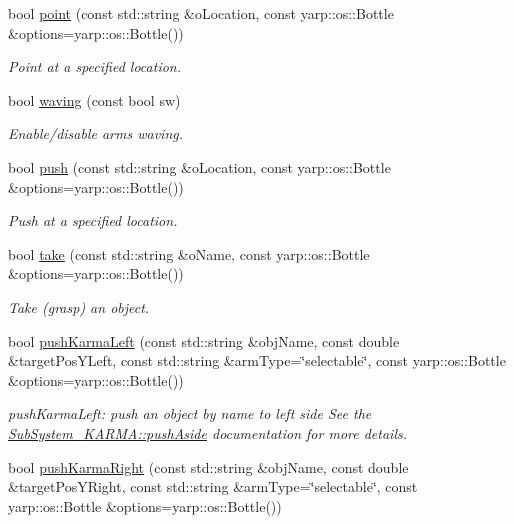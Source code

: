 \begin{DoxyCompactItemize}
\item 
bool \hyperlink{group__icubclient__clients_a16d4dfb3231983b49590f7eae62b6337}{point} (const std\+::string \&o\+Location, const yarp\+::os\+::\+Bottle \&options=yarp\+::os\+::\+Bottle())
\begin{DoxyCompactList}\small\item\em Point at a specified location. \end{DoxyCompactList}\item 
bool \hyperlink{group__icubclient__clients_a5cca1bace5eab90ed0e9618e7939b949}{waving} (const bool sw)
\begin{DoxyCompactList}\small\item\em Enable/disable arms waving. \end{DoxyCompactList}\item 
bool \hyperlink{group__icubclient__clients_a72699f9aa7aa1c3bccf4ea2b85e24fd1}{push} (const std\+::string \&o\+Location, const yarp\+::os\+::\+Bottle \&options=yarp\+::os\+::\+Bottle())
\begin{DoxyCompactList}\small\item\em Push at a specified location. \end{DoxyCompactList}\item 
bool \hyperlink{group__icubclient__clients_ab719d817deb3de266ea75e5a84898702}{take} (const std\+::string \&o\+Name, const yarp\+::os\+::\+Bottle \&options=yarp\+::os\+::\+Bottle())
\begin{DoxyCompactList}\small\item\em Take (grasp) an object. \end{DoxyCompactList}\item 
bool \hyperlink{group__icubclient__clients_a55c9ed5a628f396b215ac363cd943609}{push\+Karma\+Left} (const std\+::string \&obj\+Name, const double \&target\+Pos\+Y\+Left, const std\+::string \&arm\+Type=\char`\"{}selectable\char`\"{}, const yarp\+::os\+::\+Bottle \&options=yarp\+::os\+::\+Bottle())
\begin{DoxyCompactList}\small\item\em push\+Karma\+Left\+: push an object by name to left side See the \hyperlink{group__icubclient__subsystems_ae831bfd7af1572a65f53b11b9519e473}{Sub\+System\+\_\+\+K\+A\+R\+M\+A\+::push\+Aside} documentation for more details. \end{DoxyCompactList}\item 
bool \hyperlink{group__icubclient__clients_a3529ae126c176090205fc59059f413ce}{push\+Karma\+Right} (const std\+::string \&obj\+Name, const double \&target\+Pos\+Y\+Right, const std\+::string \&arm\+Type=\char`\"{}selectable\char`\"{}, const yarp\+::os\+::\+Bottle \&options=yarp\+::os\+::\+Bottle())

\end{DoxyCompactItemize}
